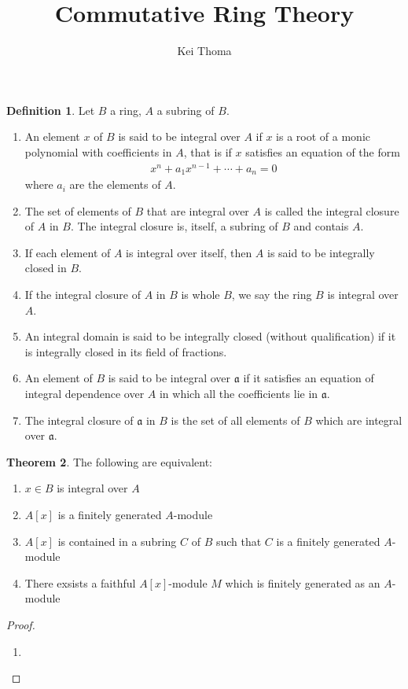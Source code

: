\documentclass[a4paper]{book}
\title{Commutative Ring Theory}
\author{Kei Thoma}
\theoremstyle{definition}
\newtheorem{definition}{Definition}[]
\newtheorem{theorem}[definition]{Theorem}
\begin{document}
\begin{defbox}
    \begin{definition}
        Let \(B\) a ring, \(A\) a subring of \(B\).
        \begin{enumerate}
            \item An element \(x\) of \(B\) is said to be integral over \(A\) if \(x\) is a root of a monic polynomial with coefficients in \(A\), that is if \(x\) satisfies an equation of the form
            \begin{align*}
                x^n + a_1 x^{n-1} + \cdots + a_n = 0
            \end{align*}
            where \(a_i\) are the elements of \(A\).
            \item The set of elements of \(B\) that are integral over \(A\) is called the integral closure of \(A\) in \(B\). The integral closure is, itself, a subring of \(B\) and contais \(A\).
            \item If each element of \(A\) is integral over itself, then \(A\) is said to be integrally closed in \(B\).
            \item If the integral closure of \(A\) in \(B\) is whole \(B\), we say the ring \(B\) is integral over \(A\).
            \item An integral domain is said to be integrally closed (without qualification) if it is integrally closed in its field of fractions.
            \item An element of \(B\) is said to be integral over \(\mathfrak{a}\) if it satisfies an equation of integral dependence over \(A\) in which all the coefficients lie in \(\mathfrak{a}\).
            \item The integral closure of \(\mathfrak{a}\) in \(B\) is the set of all elements of \(B\) which are integral over \(\mathfrak{a}\).
        \end{enumerate}
    \end{definition}
\end{defbox}

\begin{thmbox}
    \begin{theorem}
        The following are equivalent:
        \begin{enumerate}
            \item \(x \in B\) is integral over \(A\)
            \item \(A[x]\) is a finitely generated \(A\)-module
            \item \(A[x]\) is contained in a subring \(C\) of \(B\) such that \(C\) is a finitely generated \(A\)-module
            \item There exsists a faithful \(A[x]\)-module \(M\) which is finitely generated as an \(A\)-module
        \end{enumerate}
    \end{theorem}
\end{thmbox}
\begin{proof}
    \begin{enumerate}
        \item 
    \end{enumerate}
\end{proof}
\end{document}
